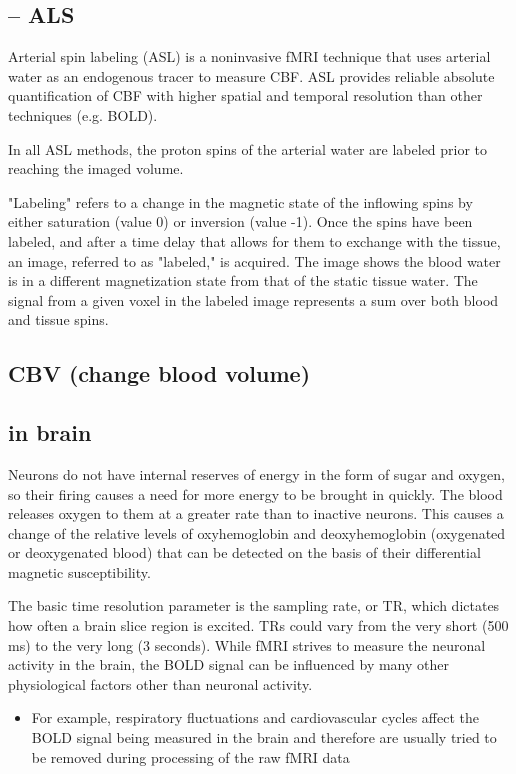 \subsection{-- ALS}
\label{sec:ALS}

Arterial spin labeling (ASL) is a noninvasive fMRI technique that uses arterial
water as an endogenous tracer to measure CBF.
ASL provides reliable absolute quantification of CBF with higher spatial and
temporal resolution than other techniques (e.g. BOLD).

In all ASL methods, the proton spins of the arterial water are labeled prior to
reaching the imaged volume.

"Labeling" refers to a change in the magnetic state of the inflowing spins by
either saturation (value 0) or inversion (value -1). Once the spins have been
labeled, and after a time delay that allows for them to exchange with the tissue, an image, referred
to as "labeled," is acquired. The image shows the blood water is in a different
magnetization state from that of the static tissue water.
 The signal from a given voxel in the labeled image represents a sum over both
blood and tissue spins.


\subsection{CBV (change blood volume)}


\subsection{in brain}

Neurons do not have internal reserves of energy in the form of sugar and oxygen,
so their firing causes a need for more energy to be brought in quickly.
The blood releases oxygen to them at a greater rate than to inactive neurons.
 This causes a change of the relative levels of oxyhemoglobin and
deoxyhemoglobin (oxygenated or deoxygenated blood) that can be detected on the
basis of their differential magnetic susceptibility.

The basic time resolution parameter is the sampling rate, or TR,  which dictates
how often a brain slice region is excited. TRs could vary from the very short
(500 ms) to the very long (3 seconds).
While fMRI strives to measure the neuronal activity in the brain, the BOLD
signal can be influenced by many other physiological factors other than neuronal
activity.
\begin{itemize}
  
  \item   For example, respiratory fluctuations and cardiovascular cycles affect
  the BOLD signal being measured in the brain and therefore are usually tried to
  be removed during processing of the raw fMRI data
  
\end{itemize}

